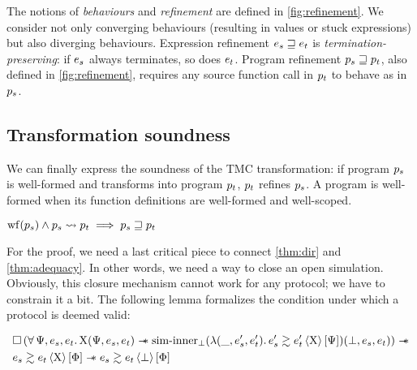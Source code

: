 The notions of \emph{behaviours} and \emph{refinement} are defined in \cref{fig:refinement}.
We consider not only converging behaviours (resulting in values or stuck expressions) but also diverging behaviours.
Expression refinement $\datalangExpr_s \refined \datalangExpr_t$ is \emph{termination-preserving}: if $\datalangExpr_s$ always terminates, so does $\datalangExpr_t$.
Program refinement $\datalangProg_s \refined \datalangProg_t$, also defined in \cref{fig:refinement}, requires any source function call in $\datalangProg_t$ to behave as in $\datalangProg_s$.

\subsection{Transformation soundness}

We can finally express the soundness of the TMC transformation: if program $\datalangProg_s$ is well-formed and transforms into program $\datalangProg_t$, $\datalangProg_t$ refines $\datalangProg_s$.
A program is well-formed when its function definitions are well-formed and well-scoped.

\begin{theorem} \label{thm:soundness}
    $
        \wf{\datalangProg_s} \wedge \datalangProg_s \tmc \datalangProg_t \implies
        \datalangProg_s \refined \datalangProg_t
    $
\end{theorem}

For the proof, we need a last critical piece to connect \cref{thm:dir} and \cref{thm:adequacy}.
In other words, we need a way to close an open simulation.
Obviously, this closure mechanism cannot work for any protocol; we have to constrain it a bit.
The following lemma formalizes the condition under which a protocol is deemed valid:

\begin{lemma}
    \begin{align*}
            &
            \iPersistent \left(
                \forall \iPredTwo, \datalangExpr_s, \datalangExpr_t \ldotp
                \iProt (\iPredTwo, \datalangExpr_s, \datalangExpr_t) \iWand
                \mathrm{sim \mathhyphen inner}_\bot (\lambdaAbs (\_, \datalangExpr_s', \datalangExpr_t') \ldotp \iSim[\iProt]{\iPredTwo}{\datalangExpr_s'}{\datalangExpr_t'}) (\bot, \datalangExpr_s, \datalangExpr_t)
            \right) \iWand
        \\
            &
            \iSim[\iProt]{\iPred}{\datalangExpr_s}{\datalangExpr_t} \iWand
            \iSim[\bot]{\iPred}{\datalangExpr_s}{\datalangExpr_t}
    \end{align*}
\end{lemma}

